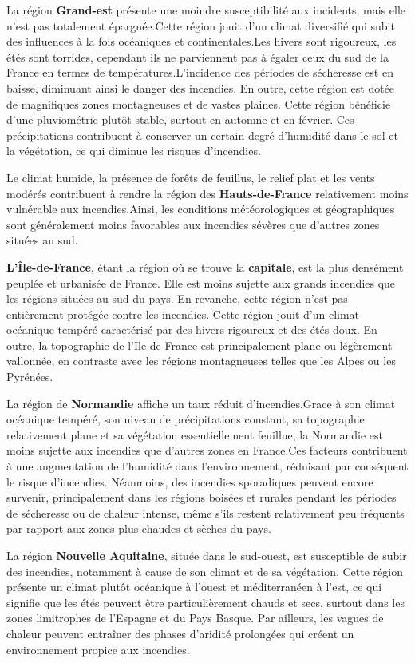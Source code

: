 \documentclass[
]{article}
\begin{document}
La région \textbf{Grand-est} présente une moindre susceptibilité aux
incidents, mais elle n'est pas totalement épargnée.Cette région jouit
d'un climat diversifié qui subit des influences à la fois océaniques et
continentales.Les hivers sont rigoureux, les étés sont torrides,
cependant ils ne parviennent pas à égaler ceux du sud de la France en
termes de températures.L'incidence des périodes de sécheresse est en
baisse, diminuant ainsi le danger des incendies. En outre, cette région
est dotée de magnifiques zones montagneuses et de vastes plaines. Cette
région bénéficie d'une pluviométrie plutôt stable, surtout en automne et
en février. Ces précipitations contribuent à conserver un certain degré
d'humidité dans le sol et la végétation, ce qui diminue les risques
d'incendies.

Le climat humide, la présence de forêts de feuillus, le relief plat et
les vents modérés contribuent à rendre la région des
\textbf{Hauts-de-France} relativement moins vulnérable aux
incendies.Ainsi, les conditions météorologiques et géographiques sont
généralement moins favorables aux incendies sévères que d'autres zones
situées au sud.

\textbf{L'Île-de-France}, étant la région où se trouve la
\textbf{capitale}, est la plus densément peuplée et urbanisée de France.
Elle est moins sujette aux grands incendies que les régions situées au
sud du pays. En revanche, cette région n'est pas entièrement protégée
contre les incendies. Cette région jouit d'un climat océanique tempéré
caractérisé par des hivers rigoureux et des étés doux. En outre, la
topographie de l'Ile-de-France est principalement plane ou légèrement
vallonnée, en contraste avec les régions montagneuses telles que les
Alpes ou les Pyrénées.

La région de \textbf{Normandie} affiche un taux réduit d'incendies.Grace
à son climat océanique tempéré, son niveau de précipitations constant,
sa topographie relativement plane et sa végétation essentiellement
feuillue, la Normandie est moins sujette aux incendies que d'autres
zones en France.Ces facteurs contribuent à une augmentation de
l'humidité dans l'environnement, réduisant par conséquent le risque
d'incendies. Néanmoins, des incendies sporadiques peuvent encore
survenir, principalement dans les régions boisées et rurales pendant les
périodes de sécheresse ou de chaleur intense, même s'ils restent
relativement peu fréquents par rapport aux zones plus chaudes et sèches
du pays.

La région \textbf{Nouvelle Aquitaine}, située dans le sud-ouest, est
susceptible de subir des incendies, notamment à cause de son climat et
de sa végétation. Cette région présente un climat plutôt océanique à
l'ouest et méditerranéen à l'est, ce qui signifie que les étés peuvent
être particulièrement chauds et secs, surtout dans les zones limitrophes
de l'Espagne et du Pays Basque. Par ailleurs, les vagues de chaleur
peuvent entraîner des phases d'aridité prolongées qui créent un
environnement propice aux incendies.
\end{document}

